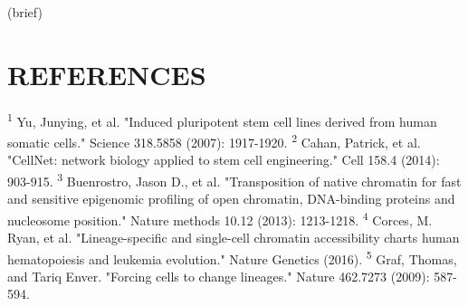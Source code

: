 \documentclass[12pt]{article}
\begin{document}
(brief) 
 \section{\textbf{{\Large R}{\small EFERENCES}}}
 \textsuperscript{1} Yu, Junying, et al. "Induced pluripotent stem cell lines derived from human somatic cells." Science 318.5858 (2007): 1917-1920. \newline
 \textsuperscript{2} Cahan, Patrick, et al. "CellNet: network biology applied to stem cell engineering." Cell 158.4 (2014): 903-915. \newline 
 \textsuperscript{3} Buenrostro, Jason D., et al. "Transposition of native chromatin for fast and sensitive epigenomic profiling of open chromatin, DNA-binding proteins and nucleosome position." Nature methods 10.12 (2013): 1213-1218. \newline 
 \textsuperscript{4} Corces, M. Ryan, et al. "Lineage-specific and single-cell chromatin accessibility charts human hematopoiesis and leukemia evolution." Nature Genetics (2016). \newline 
 \textsuperscript{5} Graf, Thomas, and Tariq Enver. "Forcing cells to change lineages." Nature 462.7273 (2009): 587-594. \newline
\end{document}
